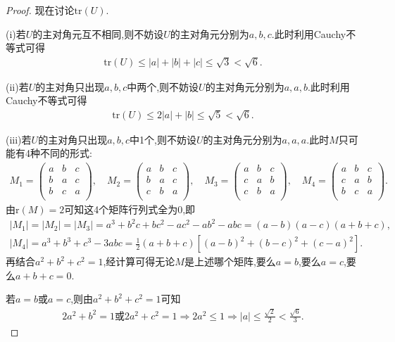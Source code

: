 \documentclass[../../main.tex]{subfiles}%
\begin{document}
\begin{proof}
现在讨论$\mathrm{tr}(U)$.

(i)若$U$的主对角元互不相同,则不妨设$U$的主对角元分别为$a,b,c$.此时利用Cauchy不等式可得
\begin{align*}
\mathrm{tr}(U) \leqslant |a|+|b|+|c|\leqslant \sqrt{3}<\sqrt{6}.
\end{align*}

(ii)若$U$的主对角只出现$a,b,c$中两个,则不妨设$U$的主对角元分别为$a,a,b$.此时利用Cauchy不等式可得
\begin{align*}
\mathrm{tr}(U) \leqslant 2|a|+|b|\leqslant \sqrt{5}<\sqrt{6}.
\end{align*}

(iii)若$U$的主对角只出现$a,b,c$中1个,则不妨设$U$的主对角元分别为$a,a,a$.此时$M$只可能有4种不同的形式:
\begin{align*}
M_1=\begin{pmatrix}
a&		b&		c\\
b&		a&		c\\
b&		c&		a\\
\end{pmatrix},\quad M_2=\begin{pmatrix}
a&		b&		c\\
b&		a&		c\\
c&		b&		a\\
\end{pmatrix},\quad M_3=\begin{pmatrix}
a&		b&		c\\
c&		a&		b\\
c&		b&		a\\
\end{pmatrix},\quad M_4=\begin{pmatrix}
a&		b&		c\\
c&		a&		b\\
b&		c&		a\\
\end{pmatrix}.
\end{align*}
由$\mathrm{r}(M) =2$可知这4个矩阵行列式全为0,即
\begin{gather*}
|M_1|=|M_2|=|M_3|=a^3+b^2c+bc^2-ac^2-ab^2-abc=(a-b)(a-c)(a+b+c),
\\
|M_4|=a^3+b^3+c^3-3abc=\frac{1}{2}(a+b+c)\left[(a-b)^2+(b-c)^2+(c-a)^2\right].
\end{gather*}
再结合$a^2+b^2+c^2=1$,经计算可得无论$M$是上述哪个矩阵,要么$a=b$,要么$a=c$,要么$a+b+c=0$.

若$a=b$或$a=c$,则由$a^2+b^2+c^2=1$可知
\begin{align*}
2a^2+b^2=1\text{或}2a^2+c^2=1\Rightarrow 2a^2\leqslant 1\Rightarrow |a|\leqslant \frac{\sqrt{2}}{2}<\frac{\sqrt{6}}{3}.
\end{align*}


\end{proof}
\end{document}
